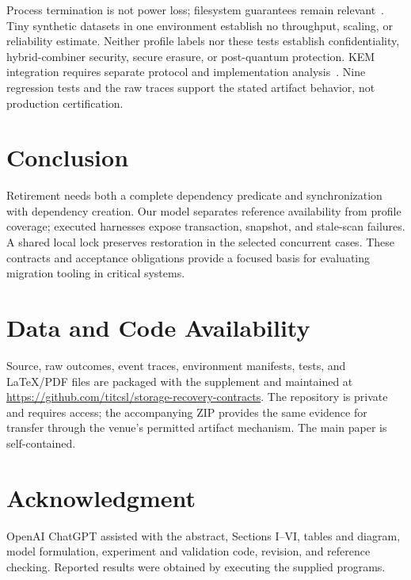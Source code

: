 \documentclass[10pt,conference]{IEEEtran}
\begin{document}
Process termination is not power loss; filesystem guarantees remain relevant~\cite{pillai}. Tiny synthetic datasets in one environment establish no throughput, scaling, or reliability estimate. Neither profile labels nor these tests establish confidentiality, hybrid-combiner security, secure erasure, or post-quantum protection. KEM integration requires separate protocol and implementation analysis~\cite{kem}. Nine regression tests and the raw traces support the stated artifact behavior, not production certification.

\section{Conclusion}
Retirement needs both a complete dependency predicate and synchronization with dependency creation. Our model separates reference availability from profile coverage; executed harnesses expose transaction, snapshot, and stale-scan failures. A shared local lock preserves restoration in the selected concurrent cases. These contracts and acceptance obligations provide a focused basis for evaluating migration tooling in critical systems.

\section*{Data and Code Availability}
Source, raw outcomes, event traces, environment manifests, tests, and LaTeX/PDF files are packaged with the supplement and maintained at \url{https://github.com/titcsl/storage-recovery-contracts}. The repository is private and requires access; the accompanying ZIP provides the same evidence for transfer through the venue's permitted artifact mechanism. The main paper is self-contained.

\section*{Acknowledgment}
OpenAI ChatGPT assisted with the abstract, Sections I--VI, tables and diagram, model formulation, experiment and validation code, revision, and reference checking. Reported results were obtained by executing the supplied programs.
\end{document}
